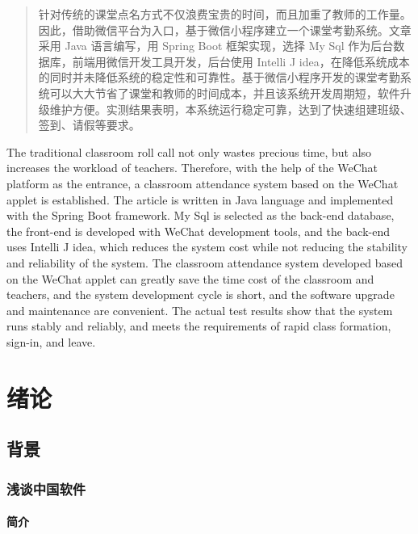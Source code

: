 \documentclass{ecnuthesis}
\begin{document}
\frontmatter

\begin{abstract}
  针对传统的课堂点名方式不仅浪费宝贵的时间，而且加重了教师的工作量。因此，借助微信平台为入口，基于微信小程序建立一个课堂考勤系统。文章采用 Java 语言编写，用 Spring Boot 框架实现，选择 My Sql 作为后台数据库，前端用微信开发工具开发，后台使用 Intelli J idea，在降低系统成本的同时并未降低系统的稳定性和可靠性。基于微信小程序开发的课堂考勤系统可以大大节省了课堂和教师的时间成本，并且该系统开发周期短，软件升级维护方便。实测结果表明，本系统运行稳定可靠，达到了快速组建班级、签到、请假等要求。
\end{abstract}

\begin{abstractEN}
  The traditional classroom roll call not only wastes precious time, but also increases the workload of teachers. Therefore, with the help of the WeChat platform as the entrance, a classroom attendance system based on the WeChat applet is established. The article is written in Java language and implemented with the Spring Boot framework. My Sql is selected as the back-end database, the front-end is developed with WeChat development tools, and the back-end uses Intelli J idea, which reduces the system cost while not reducing the stability and reliability of the system. The classroom attendance system developed based on the WeChat applet can greatly save the time cost of the classroom and teachers, and the system development cycle is short, and the software upgrade and maintenance are convenient. The actual test results show that the system runs stably and reliably, and meets the requirements of rapid class formation, sign-in, and leave.
\end{abstractEN}

\mainmatter

\chapter{绪论}
\section{背景}
\subsection{浅谈中国软件}
\subsubsection{简介}
\end{document}
